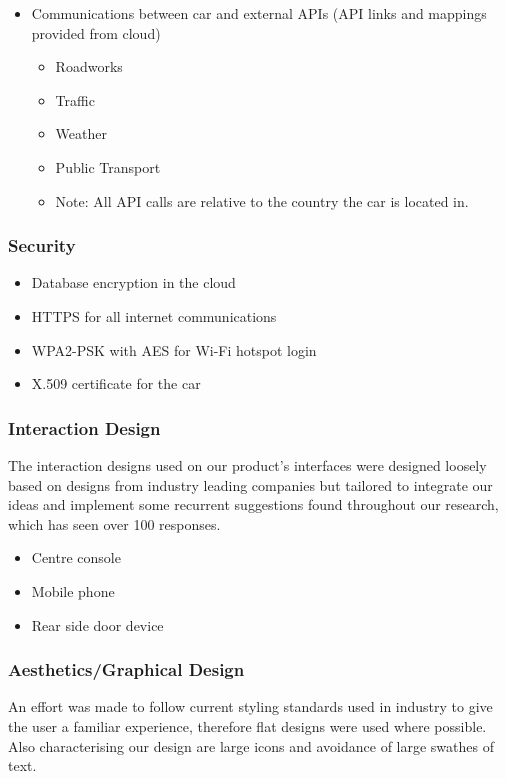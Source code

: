 \documentclass{article}
\begin{document}
\begin{itemize}
\begin{itemize}
        \end{itemize}
	  \item Communications between car and external APIs (API links and mappings provided from cloud)
        \begin{itemize}
        	\item Roadworks
            \item Traffic
            \item Weather
            \item Public Transport
            \item Note: All API calls are relative to the country the car is located in.
        \end{itemize}
	\end{itemize}

\subsubsection{Security}
	\begin{itemize}
		\item Database encryption in the cloud
        \item HTTPS for all internet communications
        \item WPA2-PSK with AES for Wi-Fi hotspot login
        \item X.509 certificate for the car
	\end{itemize}

\subsubsection{Interaction Design}
The interaction designs used on our product's interfaces were designed loosely based on designs from industry leading companies but tailored to integrate our ideas and implement some recurrent suggestions found throughout our research, which has seen over 100 responses.

    \begin{itemize}
      \item Centre console
      \item Mobile phone
      \item Rear side door device
    \end{itemize}
\subsubsection{Aesthetics/Graphical Design}
An effort was made to follow current styling standards used in industry to give the user a familiar experience, therefore flat designs were used where possible. Also characterising our design are large icons and avoidance of large swathes of text.  
    
\end{document}
